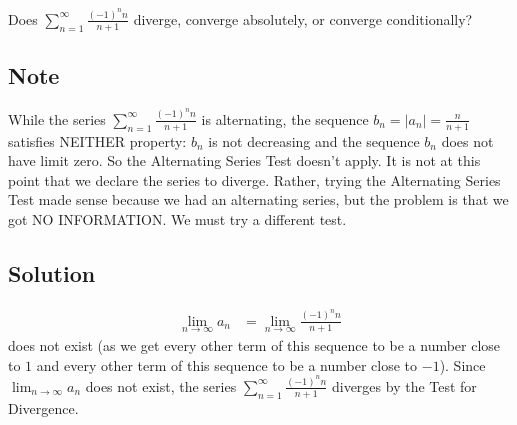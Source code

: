 \documentclass{article}
\begin{document}
\noindent
Does $\displaystyle \sum_{n=1}^\infty \frac{(-1)^nn}{n+1}$
diverge, converge absolutely, or converge conditionally?

\subsection*{Note}

While the series $\displaystyle \sum_{n=1}^\infty \frac{(-1)^nn}{n+1}$ is alternating, the sequence $b_n = |a_n| = \frac{n}{n+1}$ satisfies NEITHER property: $b_n$ is not decreasing and the sequence $b_n$ does not have limit zero. So the Alternating Series Test doesn't apply. {\color{red} It is not at this point that we declare the series to diverge. Rather, trying the Alternating Series Test made sense because we had an alternating series, but the problem is that we got NO INFORMATION.} We must try a different test.

\subsection*{Solution}

\begin{align*}
\lim_{n \to \infty} a_n
&= \lim_{n \to \infty} \frac{(-1)^nn}{n+1}
\end{align*}
does not exist (as we get every other term of this sequence to be a number close to $1$ and every other term of this sequence to be a number close to $-1$). Since $\displaystyle \lim_{n \to \infty} a_n$ does not exist, the series $\displaystyle \sum_{n=1}^\infty \frac{(-1)^nn}{n+1}$ diverges by the Test for Divergence.
\end{document}
